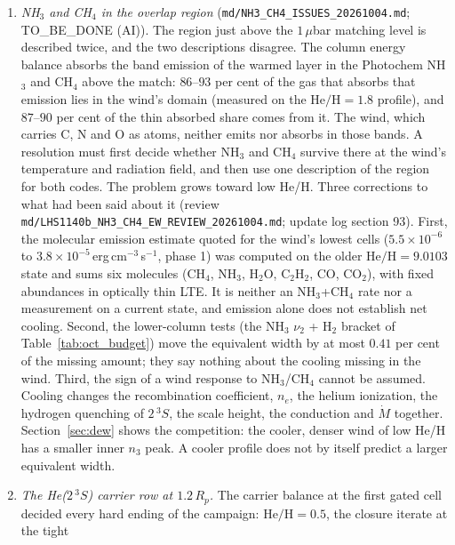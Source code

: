 \documentclass[english,a4paper]{my_memo}
\begin{document}
\begin{enumerate}\itemsep0.3ex
\item \emph{NH$_3$ and CH$_4$ in the overlap region}
      (\texttt{md/NH3\_CH4\_ISSUES\_20261004.md}; TO\_BE\_DONE (AI)). The
      region just above the $1\,\mu$bar matching level is described twice,
      and the two descriptions disagree. The column energy balance absorbs
      the band emission of the warmed layer in the Photochem NH$_3$ and
      CH$_4$ above the match: $86$--$93$ per cent of the gas that absorbs
      that emission lies in the wind's domain (measured on the
      $\mathrm{He/H} = 1.8$ profile), and $87$--$90$ per cent of the thin
      absorbed share comes from it. The wind, which carries C, N and O as
      atoms, neither emits nor absorbs in those bands. A resolution must
      first decide whether NH$_3$ and CH$_4$ survive there at the wind's
      temperature and radiation field, and then use one description of the
      region for both codes. The problem grows toward low He/H.
      Three corrections to what had been said about it (review
      \texttt{md/LHS1140b\_NH3\_CH4\_EW\_REVIEW\_20261004.md}; update log
      section 93). First, the molecular emission estimate quoted for the
      wind's lowest cells ($5.5\times10^{-6}$ to
      $3.8\times10^{-5}$\,erg\,cm$^{-3}$\,s$^{-1}$, phase 1) was computed on
      the older $\mathrm{He/H} = 9.0103$ state and sums six molecules
      (CH$_4$, NH$_3$, H$_2$O, C$_2$H$_2$, CO, CO$_2$), with fixed
      abundances in optically thin LTE. It is neither an NH$_3$+CH$_4$ rate
      nor a measurement on a current state, and emission alone does not
      establish net cooling. Second, the lower-column tests (the NH$_3$
      $\nu_2$ + H$_2$ bracket of Table~\ref{tab:oct_budget}) move the
      equivalent width by at most $0.41$ per cent of the missing amount;
      they say nothing about the cooling missing in the wind. Third, the
      sign of a wind response to NH$_3$/CH$_4$ cannot be assumed. Cooling
      changes the recombination coefficient, $n_e$, the helium ionization,
      the hydrogen quenching of $2\,^3S$, the scale height, the conduction
      and $\dot M$ together. Section~\ref{sec:dew} shows the competition:
      the cooler, denser wind of low He/H has a smaller inner $n_3$ peak.
      A cooler profile does not by itself predict a larger equivalent
      width.
\item \emph{The He($2\,^3S$) carrier row at $1.2\,R_p$.} The carrier
      balance at the first gated cell decided every hard ending of the
      campaign: $\mathrm{He/H} = 0.5$, the closure iterate at the tight

\end{enumerate}
\end{document}
